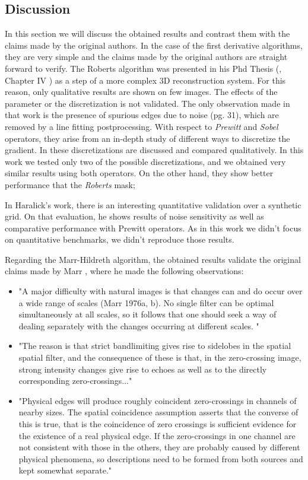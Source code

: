 \documentclass{ipol}
\numberwithin{equation}{section}
\numberwithin{table}{section}
\begin{document}
\subsection{Discussion}
In this section we will discuss the obtained results and contrast them with the claims made by the original authors.
In the case of the first derivative algorithms, they are very simple and the claims made by the original authors are straight forward to verify. The Roberts algorithm was presented in his Phd Thesis (\cite{im_proc:segmentation:roberts:1963:boundary_extraction}, Chapter IV ) as a step of a more complex 3D reconstruction system. For this reason, only qualitative results are shown on few images. The effects of the parameter or the discretization is not validated. The only observation made in that work is the presence of spurious edges due to noise (pg. 31), which are removed by a line fitting postprocessing.
With respect to \emph{Prewitt} and \emph{Sobel} operators, they arise from an in-depth study of different ways to discretize the gradient. In \cite{im_proc:segmentation:prewitt:1970:object_enhancement} these discretizations are discussed and compared qualitatively. In this work we tested only two of the possible discretizations, and we obtained very similar results using both operators. On the other hand, they show better performance that the \emph{Roberts} mask;

In Haralick's work, there is an interesting quantitative validation over a synthetic grid. On that evaluation, he shows results of noise sensitivity as well as comparative performance with Prewitt operators. As in this work we didn't focus on quantitative benchmarks, we didn't reproduce those results.

Regarding the Marr-Hildreth algorithm, the obtained results validate the original claims made by Marr \cite{segm:edge_region:marr:84:digital_step}, where he made the following observations:
\begin{itemize}
\item "A major difficulty with natural images is that changes can and do occur over a
wide range of scales (Marr 1976a, b). No single filter can be optimal simultaneously at all scales, so it follows that one should seek a way of dealing separately with the changes occurring at different scales. " 

\item "The reason is that strict bandlimiting gives rise to sidelobes in the spatial spatial filter, and the consequence of these is that, in the zero-crossing image, strong intensity changes give rise to echoes as well as to the directly corresponding zero-crossings..."

\item "Physical edges will produce roughly coincident zero-crossings in channels of nearby sizes. The spatial coincidence assumption asserts that the converse of this is true, that is the coincidence of zero crossings is sufficient evidence for the existence of a real physical edge. If the zero-crossings in one channel are not consistent with those in the others, they are probably caused by different physical phenomena, so descriptions need to be formed from both sources and kept somewhat separate."
\end{itemize}
\end{document}
